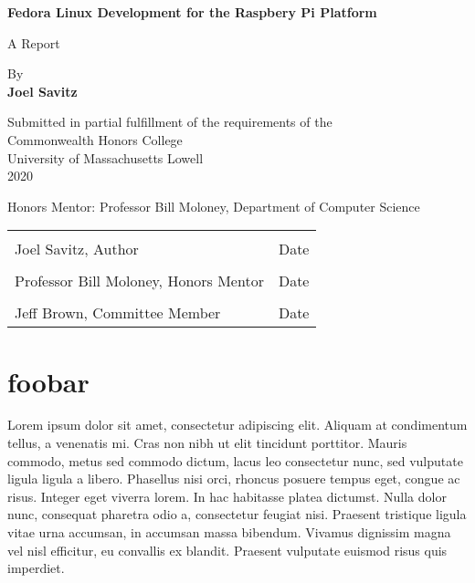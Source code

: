 \documentclass{article}
\author{Joel Savitz}
\begin{document}
\begin{titlepage}
   \begin{center}
       \vspace*{1cm}

	\textbf{Fedora Linux Development for the Raspbery Pi Platform}

       \vspace{0.5cm}
        A Report
            
       \vspace{1.5cm}

       By \\
       \textbf{Joel Savitz}

       \vfill
            
       Submitted in partial fulfillment
       of the requirements of the \\
       Commonwealth Honors College \\
       University of Massachusetts Lowell \\
       2020
            
       \vspace{0.8cm}
     
            
       Honors Mentor: Professor Bill Moloney, Department of Computer Science

\noindent\begin{tabular}{ll}
	\\[4ex]
	\makebox[4in]{\hrulefill} & \makebox[1.5in]{\hrulefill} \\
	Joel Savitz, Author & Date \\[5ex]
	\makebox[4in]{\hrulefill} & \makebox[1.5in]{\hrulefill} \\
	Professor Bill Moloney, Honors Mentor & Date \\[5ex]
	\makebox[4in]{\hrulefill} & \makebox[1.5in]{\hrulefill} \\
	Jeff Brown, Committee Member & Date \\[5ex]
\end{tabular}

            
   \end{center}
\end{titlepage}

\section{foobar}

Lorem ipsum dolor sit amet, consectetur adipiscing elit. Aliquam at condimentum tellus, a venenatis mi. Cras non nibh ut elit tincidunt porttitor. Mauris commodo, metus sed commodo dictum, lacus leo consectetur nunc, sed vulputate ligula ligula a libero. Phasellus nisi orci, rhoncus posuere tempus eget, congue ac risus. Integer eget viverra lorem. In hac habitasse platea dictumst. Nulla dolor nunc, consequat pharetra odio a, consectetur feugiat nisi. Praesent tristique ligula vitae urna accumsan, in accumsan massa bibendum. Vivamus dignissim magna vel nisl efficitur, eu convallis ex blandit. Praesent vulputate euismod risus quis imperdiet.
\end{document}
